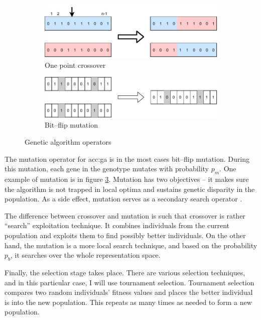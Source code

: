 \begin{figure}
    \begin{subfigure}[b]{0.4\textwidth}
        \includegraphics[width=\textwidth]{img/master_onepointcrossover.pdf}
        \caption{One point crossover}
        \label{fig:gaonepointcrossover}
    \end{subfigure}
    \hfill
    \begin{subfigure}[b]{0.4\textwidth}
        \includegraphics[width=\textwidth]{img/master_bitflipmutation.pdf}
        \caption{Bit--flip mutation}
        \label{fig:bitflipmutation}
    \end{subfigure}
    \caption{Genetic algorithm operators}
\end{figure}

The mutation operator for \acrshort{acc:ga} is in the most cases bit--flip mutation. During this mutation, each gene in the genotype mutates with probability $p_m$. One example of mutation is in figure \ref{fig:bitflipmutation}. Mutation has two objectives -- it makes sure the algorithm is not trapped in local optima and sustains genetic disparity in the population. As a side effect, mutation serves as a secondary search operator \citep{IntroToGA}.

The difference between crossover and mutation is such that crossover is rather \enquote{search} exploitation technique. It combines individuals from the current population and exploits them to find possibly better individuals. On the other hand, the mutation is a more local search technique, and based on the probability $p_b$, it searches over the whole representation space.

Finally, the selection stage takes place. There are various selection techniques, and in this particular case, I will use tournament selection. Tournament selection compares two random individuals' fitness values and places the better individual is into the new population. This repeats as many times as needed to form a new population.

